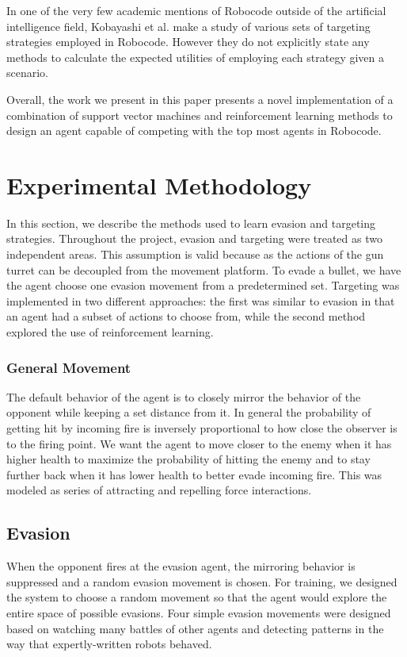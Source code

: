 \documentclass{article}
\theoremstyle{plain}
\theoremstyle{definition}
\theoremstyle{remark}
\begin{document}
In one of the very few academic mentions of Robocode outside of the artificial intelligence field, Kobayashi et al. make a study of various sets of targeting strategies employed in Robocode\cite{strategies}. However they do not explicitly state any methods to calculate the expected utilities of employing each strategy given a scenario.

Overall, the work we present in this paper presents a novel implementation of a combination of support vector machines and reinforcement learning methods to design an agent capable of competing with the top most agents in Robocode.

\section{Experimental Methodology}
In this section, we describe the methods used to learn evasion and targeting strategies. Throughout the project, evasion and targeting were treated as two independent areas. This assumption is valid because as the actions of the gun turret can be decoupled from the movement platform. To evade a bullet, we have the agent choose one evasion movement from a predetermined set. Targeting was implemented in two different approaches: the first was similar to evasion in that an agent had a subset of actions to choose from, while the second method explored the use of reinforcement learning.

\subsubsection*{General Movement}
The default behavior of the agent is to closely mirror the behavior of the opponent while keeping a set distance from it. In general the probability of getting hit by incoming fire is inversely proportional to how close the observer is to the firing point. We want the agent to move closer to the enemy when it has higher health to maximize the probability of hitting the enemy and to stay further back when it has lower health to better evade incoming fire. This was modeled as series of attracting and repelling force interactions.

\subsection*{Evasion}
When the opponent fires at the evasion agent, the mirroring behavior is suppressed and a random evasion movement is chosen. For training, we designed the system to choose a random movement so that the agent would explore the entire space of possible evasions. Four simple evasion movements were designed based on watching many battles of other agents and detecting patterns in the way that expertly-written robots behaved.
\end{document}
